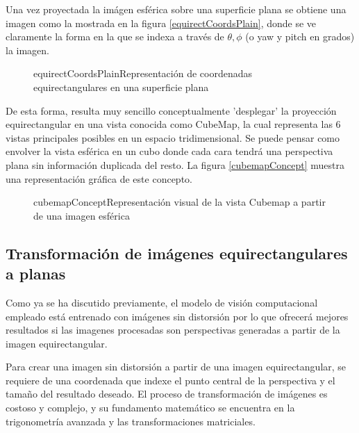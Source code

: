 Una vez proyectada la imágen esférica sobre una superficie plana se obtiene una imagen como la mostrada en la figura \ref{equirectCoordsPlain}, donde se ve claramente la forma en la que se indexa a través de $\theta, \phi$ (o yaw y pitch en grados) la imagen.


\begin{figure}[Representación de coordenadas equirectangulares]{equirectCoordsPlain}{Representación de coordenadas equirectangulares en una superficie plana}
	\begin{center}
	\end{center}
\end{figure}

De esta forma, resulta muy sencillo conceptualmente 'desplegar' la proyección equirectangular en una vista conocida como CubeMap, la cual representa las 6 vistas principales posibles en un espacio tridimensional. Se puede pensar como envolver la vista esférica en un cubo donde cada cara tendrá una perspectiva plana sin información duplicada del resto. La figura \ref{cubemapConcept} muestra una representación gráfica de este concepto.

\begin{figure}[Representación visual de cubemap]{cubemapConcept}{Representación visual de la vista Cubemap a partir de una imagen esférica \cite{ramirez2014cubemaps}}
	\begin{center}
	\end{center}
\end{figure}

\subsection{Transformación de imágenes equirectangulares a planas}
Como ya se ha discutido previamente, el modelo de visión computacional empleado está entrenado con imágenes sin distorsión por lo que ofrecerá mejores resultados si las imagenes procesadas son perspectivas generadas a partir de la imagen equirectangular.

Para crear una imagen sin distorsión a partir de una imagen equirectangular, se requiere de una coordenada que indexe el punto central de la perspectiva y el tamaño del resultado deseado. 
El proceso de transformación de imágenes es costoso y complejo, y su fundamento matemático se encuentra en la trigonometría avanzada y las transformaciones matriciales.

